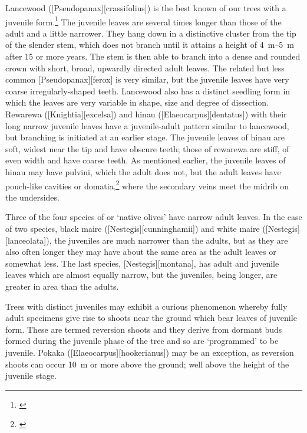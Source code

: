 Lancewood ([Pseudopanax][crassifolius]) is the best known of our trees with a juvenile form.\footnote{\cite{laing1906plants}}
The juvenile leaves are several times longer than those of the adult and a little narrower.
They hang down in a distinctive cluster from the tip of the slender stem, which does not branch until it attains a height of \SIrange{4}{5}{\metre} after 15 or more years.
The stem is then able to branch into a dense and rounded crown with short, broad, upwardly directed adult leaves.
The related but less common [Pseudopanax][ferox] is very similar, but the juvenile leaves have very coarse irregularly-shaped teeth.
Lancewood also has a distinct seedling form in which the leaves are very variable in shape, size and degree of dissection.
Rewarewa ([Knightia][excelsa]) and hinau ([Elaeocarpus][dentatus]) with their long narrow juvenile leaves have a juvenile-adult pattern similar to lancewood, but branching is initiated at an earlier stage.
The juvenile leaves of hinau are soft, widest near the tip and have obscure teeth; those of rewarewa are stiff, of even width and have coarse teeth.
As mentioned earlier, the juvenile leaves of hinau may have pulvini, which the adult does not, but the adult leaves have pouch-like cavities or domatia,\footnote{\cite{sampson1965domatia}} where the secondary veins meet the midrib on the undersides.

Three of the four species of  or `native olives' have narrow adult leaves.
In the case of two species, black maire ([Nestegis][cunninghamii]) and white maire ([Nestegis][lanceolata]), the juveniles are much narrower than the adults, but as they are also often longer they may have about the same area as the adult leaves or somewhat less.
The last species, [Nestegis][montana], has adult and juvenile leaves which are almost equally narrow, but the juveniles, being longer, are greater in area than the adults.

Trees with distinct juveniles may exhibit a curious phenomenon whereby fully adult specimens give rise to shoots near the ground which bear leaves of juvenile form.
These are termed reversion shoots and they derive from dormant buds formed during the juvenile phase of the tree and so are `programmed' to be juvenile.
Pokaka ([Elaeocarpus][hookerianus]) may be an exception, as reversion shoots can occur \SI{10}{\metre} or more above the ground; well above the height of the juvenile stage.

